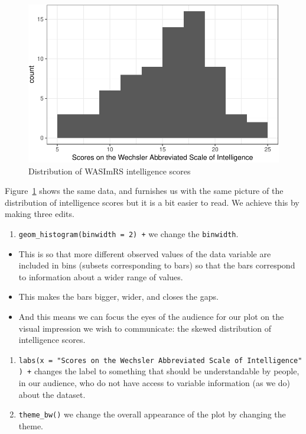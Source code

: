 \documentclass[
  letterpaper,
  DIV=11,
  numbers=noendperiod]{scrreprt}
\providecommand{\tightlist}{%
  \setlength{\itemsep}{0pt}\setlength{\parskip}{0pt}}\usepackage{longtable,booktabs,array}
\begin{document}
\begin{figure}[H]

{\centering \includegraphics{visualization_files/figure-pdf/fig-hist-WASImRS-edits-1.pdf}

}

\caption{\label{fig-hist-WASImRS-edits}Distribution of WASImRS
intelligence scores}

\end{figure}

Figure~\ref{fig-hist-WASImRS-edits} shows the same data, and furnishes
us with the same picture of the distribution of intelligence scores but
it is a bit easier to read. We achieve this by making three edits.

\begin{enumerate}
\def\labelenumi{\arabic{enumi}.}
\tightlist
\item
  \texttt{geom\_histogram(binwidth\ =\ 2)\ +} we change the
  \texttt{binwidth}.
\end{enumerate}

\begin{itemize}
\tightlist
\item
  This is so that more different observed values of the data variable
  are included in bins (subsets corresponding to bars) so that the bars
  correspond to information about a wider range of values.
\item
  This makes the bars bigger, wider, and closes the gaps.
\item
  And this means we can focus the eyes of the audience for our plot on
  the visual impression we wish to communicate: the skewed distribution
  of intelligence scores.
\end{itemize}

\begin{enumerate}
\def\labelenumi{\arabic{enumi}.}
\setcounter{enumi}{1}
\tightlist
\item
  \texttt{labs(x\ =\ "Scores\ on\ the\ Wechsler\ Abbreviated\ Scale\ of\ Intelligence")\ +}
  changes the label to something that should be understandable by
  people, in our audience, who do not have access to variable
  information (as we do) about the dataset.
\item
  \texttt{theme\_bw()} we change the overall appearance of the plot by
  changing the theme.
\end{enumerate}
\end{document}
